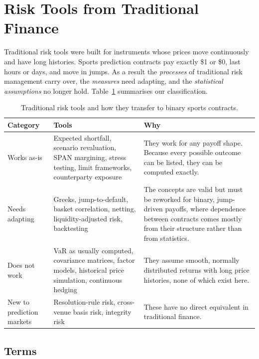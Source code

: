 \section{Risk Tools from Traditional Finance}\label{sec:tools}

Traditional risk tools were built for instruments whose prices move continuously and have long histories. Sports prediction contracts pay exactly \$1 or \$0, last hours or days, and move in jumps. As a result the \emph{processes} of traditional risk management carry over, the \emph{measures} need adapting, and the \emph{statistical assumptions} no longer hold. Table~\ref{tab:tools} summarises our classification.

\begin{table}[H]
\centering
\small
\begin{tabular}{p{2.6cm}p{5.2cm}p{6.2cm}}
\toprule
\textbf{Category} & \textbf{Tools} & \textbf{Why} \\
\midrule
Works as-is & Expected shortfall, scenario revaluation, SPAN margining, stress testing, limit frameworks, counterparty exposure & They work for any payoff shape. Because every possible outcome can be listed, they can be computed exactly. \\
Needs adapting & Greeks, jump-to-default, basket correlation, netting, liquidity-adjusted risk, backtesting & The concepts are valid but must be reworked for binary, jump-driven payoffs, where dependence between contracts comes mostly from their structure rather than from statistics. \\
Does not work & VaR as usually computed, covariance matrices, factor models, historical price simulation, continuous hedging & They assume smooth, normally distributed returns with long price histories, none of which exist here. \\
New to prediction markets & Resolution-rule risk, cross-venue basis risk, integrity risk & These have no direct equivalent in traditional finance. \\
\bottomrule
\end{tabular}
\caption{Traditional risk tools and how they transfer to binary sports contracts.}
\label{tab:tools}
\end{table}

\subsection{Terms}

